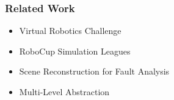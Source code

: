 \documentclass[]{beamer}
\begin{document}
\begin{frame}
  \frametitle{Related Work}
  \begin{multicols}{2}
    
    \begin{overlayarea}{0.52\textwidth}{.5\textheight}
      \begin{itemize}
      \item Virtual Robotics Challenge
        \pause
      \item RoboCup Simulation Leagues
        \pause
      \item Scene Reconstruction for Fault Analysis
        \pause
      \item Multi-Level Abstraction
      \end{itemize}
    \end{overlayarea}
  \end{multicols}
\end{frame}

\end{document}
